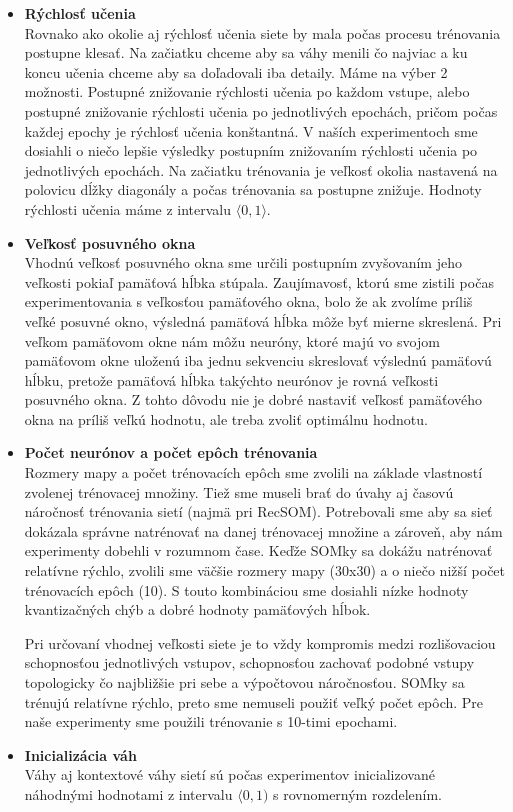 \begin{itemize}
    \item \textbf{Rýchlosť učenia} \\
    Rovnako ako okolie aj rýchlosť učenia siete by mala počas
procesu trénovania postupne klesať. Na začiatku chceme aby sa váhy menili čo najviac
a ku koncu učenia chceme aby sa doľadovali iba detaily.
Máme na výber 2 možnosti. Postupné znižovanie rýchlosti učenia po každom vstupe, alebo 
postupné znižovanie rýchlosti učenia po jednotlivých epochách, pričom počas každej epochy
je rýchlosť učenia konštantná. 
V naších experimentoch sme dosiahli o niečo lepšie výsledky postupním znižovaním rýchlosti
učenia po jednotlivých epochách. Na začiatku trénovania je veľkosť okolia nastavená na polovicu dĺžky diagonály a počas
trénovania sa postupne znižuje.
Hodnoty rýchlosti učenia máme z intervalu $\langle0, 1\rangle$.
    \item \textbf{Veľkosť posuvného okna} \\
    Vhodnú veľkosť posuvného okna sme určili postupním zvyšovaním jeho veľkosti pokiaľ pamäťová hĺbka stúpala. 
Zaujímavosť, ktorú sme zistili počas experimentovania s veľkosťou pamäťového okna, bolo že 
ak zvolíme príliš veľké posuvné okno, výsledná pamäťová hĺbka môže byť mierne skreslená.
Pri veľkom pamäťovom okne nám môžu neuróny, ktoré majú vo svojom pamäťovom okne uloženú iba 
jednu sekvenciu skreslovať výslednú pamäťovú hĺbku, pretože pamäťová hĺbka takýchto
neurónov je rovná veľkosti posuvného okna. Z tohto dôvodu nie je dobré nastaviť veľkosť pamäťového okna na 
príliš veľkú hodnotu, ale treba zvoliť optimálnu hodnotu.
    \item \textbf{Počet neurónov a počet epôch trénovania} \\
    Rozmery mapy a počet trénovacích epôch sme zvolili na základe vlastností zvolenej trénovacej množiny. 
Tiež sme museli brať do úvahy aj časovú náročnosť trénovania sietí (najmä pri RecSOM).
Potrebovali sme aby sa sieť dokázala správne natrénovať na danej trénovacej množine a zároveň, aby nám experimenty dobehli v rozumnom čase.
Keďže SOMky sa dokážu natrénovať relatívne rýchlo, zvolili sme väčšie rozmery mapy (30x30) a o niečo nižší počet trénovacích epôch (10).
S touto kombináciou sme dosiahli nízke hodnoty kvantizačných chýb a dobré hodnoty pamäťových hĺbok.

Pri určovaní vhodnej veľkosti siete je to vždy kompromis medzi rozlišovaciou schopnosťou jednotlivých vstupov, schopnosťou
zachovať podobné vstupy topologicky čo najbližšie pri sebe a výpočtovou náročnosťou. 
SOMky sa trénujú relatívne rýchlo, preto sme nemuseli použiť veľký počet epôch. Pre naše experimenty sme 
použili trénovanie s 10-timi epochami.
    \item \textbf{Inicializácia váh} \\ 
Váhy aj kontextové váhy sietí sú počas experimentov inicializované náhodnými hodnotami z intervalu $\langle0, 1)$ s rovnomerným rozdelením.
\end{itemize}



